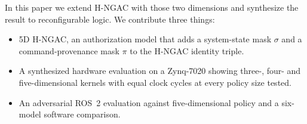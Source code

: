\documentclass[conference]{IEEEtran}
\newcommand{\new}[1]{#1}
\begin{document}
In this paper we extend H-NGAC with those two dimensions and synthesize the result to reconfigurable logic. We contribute three things:
\begin{itemize}
    \item 5D H-NGAC, an authorization model that adds a system-state mask $\sigma$ and a command-provenance mask $\pi$ to the H-NGAC identity triple. %
    \item A synthesized hardware evaluation on a Zynq-7020 showing three-, four- and five-dimensional kernels with equal clock cycles at every policy size tested. %
    \item An adversarial ROS~2 evaluation against five-dimensional policy and a six-model software comparison.
\end{itemize}
\end{document}
